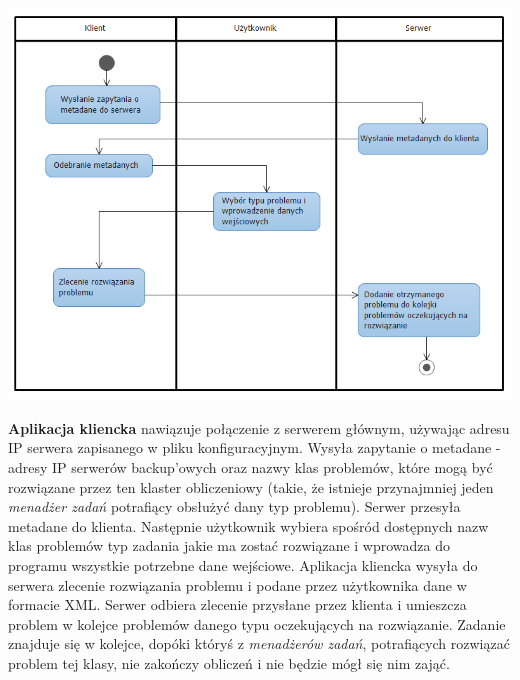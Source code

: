 \documentclass[12pt,a4paper,titlepage]{report}
\begin{document}
		\includegraphics[width=\textwidth]{img/diagram1.png}		
		
		\textbf{Aplikacja kliencka} nawiązuje połączenie z serwerem głównym, używając adresu IP serwera zapisanego w pliku konfiguracyjnym. Wysyła zapytanie o metadane - adresy IP serwerów backup'owych oraz nazwy klas problemów, które mogą być rozwiązane przez ten klaster obliczeniowy (takie, że istnieje przynajmniej jeden \textit{menadżer zadań} potrafiący obsłużyć dany typ problemu). Serwer przesyła metadane do klienta. Następnie użytkownik wybiera spośród dostępnych nazw klas problemów typ zadania jakie ma zostać rozwiązane i wprowadza do programu wszystkie potrzebne dane wejściowe. Aplikacja kliencka wysyła do serwera zlecenie rozwiązania problemu i podane przez użytkownika dane w formacie XML.
Serwer odbiera zlecenie przysłane przez klienta i umieszcza problem w kolejce problemów danego typu oczekujących na rozwiązanie. Zadanie znajduje się w kolejce, dopóki któryś z \textit{menadżerów zadań}, potrafiących rozwiązać problem tej klasy, nie zakończy obliczeń i nie będzie mógł się nim zająć.
\end{document}
